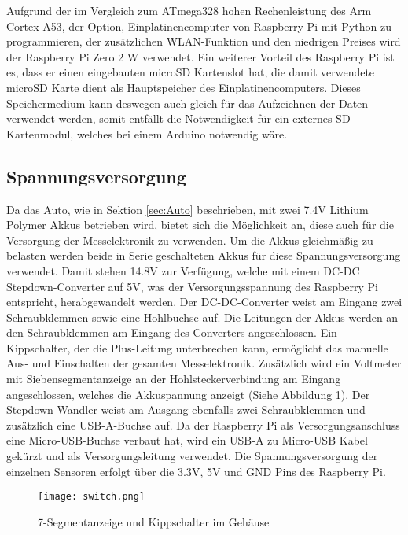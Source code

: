 Aufgrund der im Vergleich zum ATmega328 hohen Rechenleistung des Arm Cortex-A53, der Option, Einplatinencomputer von Raspberry Pi mit Python zu programmieren, der zusätzlichen \ac{WLAN}-Funktion und den niedrigen Preises wird der Raspberry Pi Zero 2 W verwendet. Ein weiterer Vorteil des Raspberry Pi ist es, dass er einen eingebauten microSD Kartenslot hat, die damit verwendete microSD Karte dient als Hauptspeicher des Einplatinencomputers. Dieses Speichermedium kann deswegen auch gleich für das Aufzeichnen der Daten verwendet werden, somit entfällt die Notwendigkeit für ein externes SD-Kartenmodul, welches bei einem Arduino notwendig wäre.

\subsection{Spannungsversorgung}
\label{subsec:elekSupply}
Da das Auto, wie in Sektion \ref{sec:Auto} beschrieben, mit zwei 7.4\ac{V} Lithium Polymer Akkus betrieben wird, bietet sich die Möglichkeit an, diese auch für die Versorgung der Messelektronik zu verwenden. Um die Akkus gleichmäßig zu belasten werden beide in Serie geschalteten Akkus für diese Spannungsversorgung verwendet. Damit stehen 14.8\ac{V} zur Verfügung, welche mit einem DC-DC Stepdown-Converter auf 5\ac{V}, was der Versorgungsspannung des Raspberry Pi entspricht, herabgewandelt werden. Der DC-DC-Converter weist am Eingang zwei Schraubklemmen sowie eine Hohlbuchse auf. Die Leitungen der Akkus werden an den Schraubklemmen am Eingang des Converters angeschlossen. Ein Kippschalter, der die Plus-Leitung unterbrechen kann, ermöglicht das manuelle Aus- und Einschalten der gesamten Messelektronik. Zusätzlich wird ein Voltmeter mit Siebensegmentanzeige an der Hohlsteckerverbindung am Eingang angeschlossen, welches die Akkuspannung anzeigt (Siehe Abbildung \ref{fig:switch}). Der Stepdown-Wandler weist am Ausgang ebenfalls zwei Schraubklemmen und zusätzlich eine \ac{USB}-A-Buchse auf. Da der Raspberry Pi als Versorgungsanschluss eine Micro-\ac{USB}-Buchse verbaut hat, wird ein USB-A zu Micro-\ac{USB} Kabel gekürzt und als Versorgungsleitung verwendet. Die Spannungsversorgung der einzelnen Sensoren erfolgt über die 3.3\ac{V}, 5\ac{V} und GND Pins des Raspberry Pi. 

\begin{figure}[h]
\centering
\texttt{[image: switch.png]}
\caption{7-Segmentanzeige und Kippschalter im Gehäuse}
\label{fig:switch}
\end{figure}

